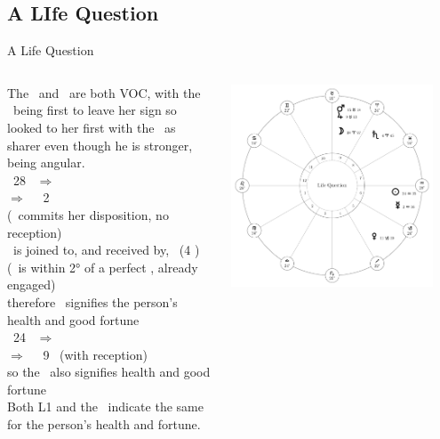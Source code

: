\subsection{A LIfe Question}
\begin{frame}[t]{A Life Question}
\begin{columns}[T, onlytextwidth]
The \Sun\ and \Moon\ are both VOC, with the \Moon\ being first to leave her sign so looked to her first with the \Sun\ as sharer even though he is stronger, being angular.\\
\vspace{0.25cm}
\Moon\ 28 \Aries\ $\Rightarrow$ \Taurus \\
$\Rightarrow$ \Square\ \Mercury\ 2 \Aquarius\ \\
\hspace{1em} (\Moon\ commits her disposition, no reception) \\
\Mercury\ is joined to, and received by, \Saturn\ (4 \Aries) \\
\hspace{1em}(\Mercury\ is within 2° of a perfect \Sextile, already engaged) \\
therefore \Saturn\ signifies the person's health and good fortune\\
\vspace{0.25cm}
\Sun\ 24 \Aquarius\ $\Rightarrow$ \Pisces \\
$\Rightarrow$ \Sextile\ \Jupiter\ 9 \Taurus\  (with reception) \\
so the \Sun\ also signifies health and good fortune \\
\vspace{0.25cm}
Both L1 and the \Moon\ indicate the same for the person's health and fortune.
\begin{center}
{\includegraphics[width=0.9\textwidth]{charts/22-chart-life}}
\end{center}
\end{columns}
\end{frame}
